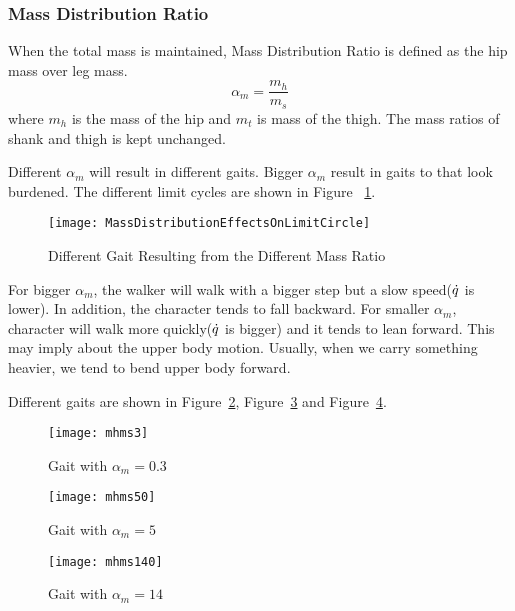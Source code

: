\subsubsection*{Mass Distribution Ratio}
When the total mass is maintained,
Mass Distribution Ratio is defined as the hip mass over leg mass. 
\[
\alpha_m=\frac{m_h}{m_s}
\]
where $m_h$ is the mass of the hip and $m_t$ is mass of the thigh.
The mass ratios of shank and thigh is kept unchanged.

Different $\alpha_m$ will result in different gaits.
Bigger $\alpha_m$ result in gaits to that  look burdened.
The different limit cycles are shown in Figure ~\ref{fig:differentmh}.
\begin{figure}[!htbp]
  \begin{center}
     \texttt{[image: MassDistributionEffectsOnLimitCircle]}
    \caption{Different Gait Resulting from the Different Mass Ratio}
    \label{fig:differentmh}
\end{center}
\end{figure}

For bigger $\alpha_m$, the walker will walk with a  bigger step but a slow speed($\dot{q}$ is lower).
In addition, the character tends to fall backward.
For smaller $\alpha_m$, character will walk more quickly($\dot{q}$ is bigger) and it tends to lean forward.
This may imply about the upper body motion.
Usually, when we carry something heavier, we tend to bend upper body forward.

Different gaits are shown in Figure~\ref{fig:massh1}, Figure~\ref{fig:massh2} and Figure~\ref{fig:massh3}.
\begin{figure}[!htbp]
  \begin{center}
      \texttt{[image: mhms3]}
    \caption{Gait with $\alpha_m=0.3$}
    \label{fig:massh1}
\end{center}
\end{figure}

\begin{figure}[!htbp]
  \begin{center}
      \texttt{[image: mhms50]}
    \caption{Gait with $\alpha_m=5$}
    \label{fig:massh2}
\end{center}
\end{figure}

\begin{figure}[!htbp]
  \begin{center}
      \texttt{[image: mhms140]}
    \caption{Gait with $\alpha_m=14$}
    \label{fig:massh3}
\end{center}
\end{figure}




